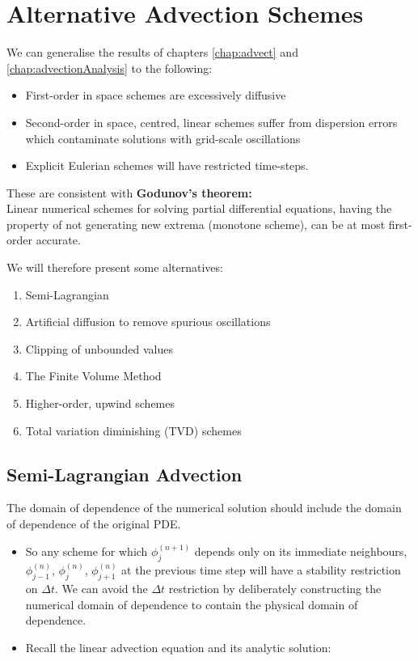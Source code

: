 \chapter{Alternative Advection Schemes}

We can generalise the results of chapters \ref{chap:advect} and \ref{chap:advectionAnalysis} to the following:
\begin{itemize}
\item First-order in space schemes are excessively diffusive
\item Second-order in space, centred, linear schemes suffer from dispersion errors which contaminate solutions with grid-scale oscillations
\item Explicit Eulerian schemes will have restricted time-steps.
\end{itemize}

These are consistent with {\bf Godunov's theorem:}\\

Linear numerical schemes for solving partial differential equations, having the property of not generating new extrema (monotone scheme), can be at most first-order accurate.

We will therefore present some alternatives:
\begin{enumerate}
\item Semi-Lagrangian
\item Artificial diffusion to remove spurious oscillations
\item Clipping of unbounded values
\item The Finite Volume Method
\item Higher-order, upwind schemes
\item Total variation diminishing (TVD) schemes
\end{enumerate}

\clearpage
\section{Semi-Lagrangian Advection}

 The domain of dependence of the numerical
solution should include the domain of dependence of the original PDE.

\begin{itemize}
\item So any scheme for which $\phi_j^{(n+1)}$ depends only on its immediate neighbours, $\phi_{j-1}^{(n)}$,  $\phi_{j}^{(n)}$,  $\phi_{j+1}^{(n)}$ at the previous time step will have a stability restriction on $\Delta t$. We can avoid the $\Delta t$ restriction by deliberately constructing the numerical domain of dependence to contain the physical domain of dependence. 

\item Recall the linear advection equation and its analytic solution:
\end{itemize}

